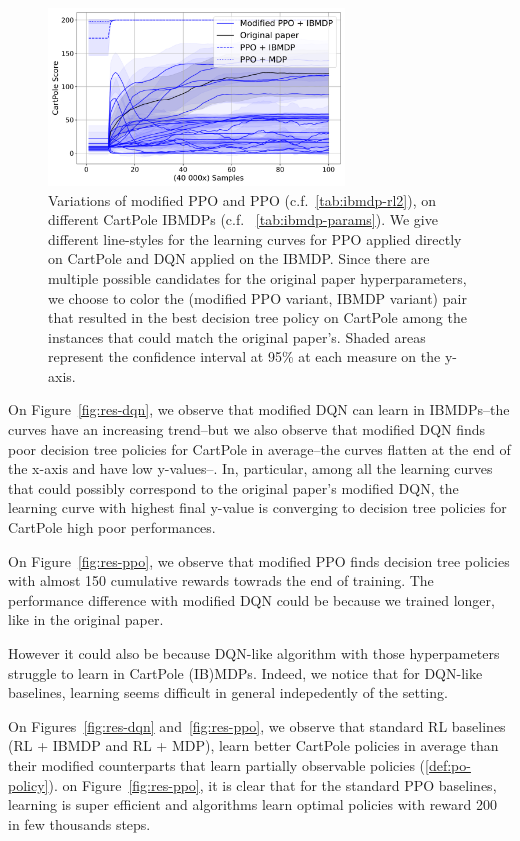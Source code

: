 \begin{figure}
    \centering
    \includegraphics[width=0.7\textwidth]{images/images_part1/ppo.pdf}
    \caption{Variations of modified PPO and PPO (c.f.~\ref{tab:ibmdp-rl2}), on different CartPole IBMDPs (c.f. ~\ref{tab:ibmdp-params}). We give different line-styles for the learning curves for PPO applied directly on CartPole and DQN applied on the IBMDP.
    Since there are multiple possible candidates for the original paper hyperparameters, we choose to color the (modified PPO variant, IBMDP variant) pair that resulted in the best decision tree policy on CartPole among the instances that could match the original paper's.
    Shaded areas represent the confidence interval at 95\% at each measure on the y-axis.}
\end{figure}\label{fig:res-ppo}

On Figure~\ref{fig:res-dqn}, we observe that modified DQN can learn in IBMDPs--the curves have an increasing trend--but we also observe that modified DQN finds poor decision tree policies for CartPole in average--the curves flatten at the end of the x-axis and have low y-values--.
In, particular, among all the learning curves that could possibly correspond to the original paper's modified DQN, the learning curve with highest final y-value is converging to decision tree policies for CartPole high poor performances.

On Figure~\ref{fig:res-ppo}, we observe that modified PPO finds decision tree policies with almost 150 cumulative rewards towrads the end of training. The performance difference with modified DQN could be because we trained longer, like in the original paper.

However it could also be because DQN-like algorithm with those hyperpameters struggle to learn in CartPole (IB)MDPs.
Indeed, we notice that for DQN-like baselines, learning seems difficult in general indepedently of the setting.

On Figures~\ref{fig:res-dqn} and~\ref{fig:res-ppo}, we observe that standard RL baselines (RL + IBMDP and RL + MDP), learn better CartPole policies in average than their modified counterparts that learn partially observable policies (\ref{def:po-policy}). 
on Figure~\ref{fig:res-ppo}, it is clear that for the standard PPO baselines, learning is super efficient and algorithms learn optimal policies with reward 200 in few thousands steps.

